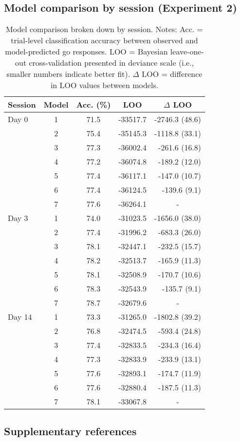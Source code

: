\documentclass[a4paper,12pt]{article}
\begin{document}
\begin{refsection}[supp]
\clearpage
\subsection*{Model comparison by session (Experiment 2)}

\begin{table}[h]
    \centering
    \begin{tabular}{lcccr}
        \toprule
        Session & Model & Acc. (\%) & LOO & \multicolumn{1}{c}{$\Delta$ LOO} \\
        \midrule
         Day 0 & 1 & 71.5 & -33517.7 & -2746.3 (48.6) \\
         & 2 & 75.4 & -35145.3 & -1118.8 (33.1) \\
         & 3 & 77.3 & -36002.4 & -261.6 (16.8) \\
         & 4 & 77.2 & -36074.8 & -189.2 (12.0) \\
         & 5 & 77.4 & -36117.1 & -147.0 (10.7) \\
         & 6 & 77.4 & -36124.5 & -139.6 (9.1) \\
         & 7 & 77.6 & -36264.1 & \multicolumn{1}{c}{-} \\
         \midrule
         Day 3 & 1 & 74.0 & -31023.5 & -1656.0 (38.0) \\
         & 2 & 77.4 & -31996.2 & -683.3 (26.0) \\
         & 3 & 78.1 & -32447.1 & -232.5 (15.7) \\
         & 4 & 78.2 & -32513.7 & -165.9 (11.3) \\
         & 5 & 78.1 & -32508.9 & -170.7 (10.6) \\
         & 6 & 78.3 & -32543.9 & -135.7 (9.1) \\
         & 7 & 78.7 & -32679.6 & \multicolumn{1}{c}{-} \\
         \midrule
         Day 14 & 1 & 73.3 & -31265.0 & -1802.8 (39.2) \\
         & 2 & 76.8 & -32474.5 & -593.4 (24.8) \\
         & 3 & 77.4 & -32833.5 & -234.3 (16.4) \\
         & 4 & 77.3 & -32833.9 & -233.9 (13.1) \\
         & 5 & 77.6 & -32893.1 & -174.7 (11.9) \\
         & 6 & 77.6 & -32880.4 & -187.5 (11.3) \\
         & 7 & 78.1 & -33067.8 & \multicolumn{1}{c}{-} \\
         \bottomrule
    \end{tabular}
    \caption{Model comparison broken down by session. Notes: Acc. = trial-level classification accuracy between observed and model-predicted go responses. LOO = Bayesian leave-one-out cross-validation presented in deviance scale (i.e., smaller numbers indicate better fit). $\Delta$ LOO = difference in LOO values between models.}
    \label{tab:exp2_mc_full}
\end{table}

\break
\subsection*{Supplementary references}
\printbibliography[heading=supp]
\end{refsection}

\end{document}
